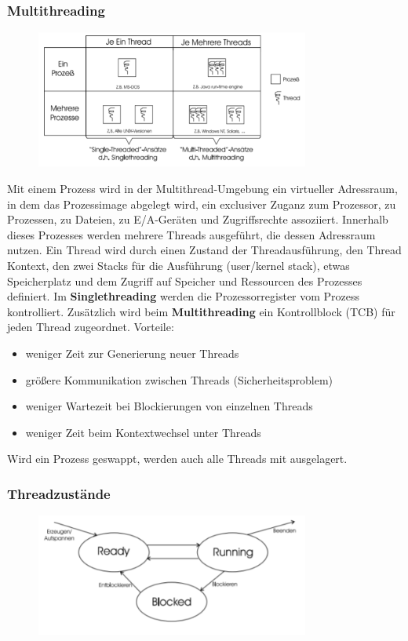 \documentclass{article}
\begin{document}
\subsubsection{Multithreading}
    \begin{figure}[h]
        \centering
	    \includegraphics[width=90mm]{Skizzen/2_Kapitel/multithread.png}
    \end{figure}
    Mit einem Prozess wird in der Multithread-Umgebung ein virtueller Adressraum, in dem das Prozessimage abgelegt wird, ein exclusiver Zuganz zum Prozessor, zu Prozessen, zu Dateien, zu E/A-Geräten und Zugriffsrechte assoziiert.\newline
    Innerhalb dieses Prozesses werden mehrere Threads ausgeführt, die dessen Adressraum nutzen. Ein Thread wird durch einen Zustand der Threadausführung, den Thread Kontext, den zwei Stacks für die Ausführung (user/kernel stack), etwas Speicherplatz und dem Zugriff auf Speicher und Ressourcen des Prozesses definiert.\newline
    Im \textbf{Singlethreading} werden die Prozessorregister vom Prozess kontrolliert. Zusätzlich wird beim \textbf{Multithreading} ein Kontrollblock (TCB) für jeden Thread zugeordnet.\newline
    Vorteile:
    \begin{itemize}
        \item weniger Zeit zur Generierung neuer Threads
        \item größere Kommunikation zwischen Threads (Sicherheitsproblem)
        \item weniger Wartezeit bei Blockierungen von einzelnen Threads
        \item weniger Zeit beim Kontextwechsel unter Threads
    \end{itemize}
    Wird ein Prozess geswappt, werden auch alle Threads mit ausgelagert. 
\subsubsection{Threadzustände}
    \begin{figure}[h]
        \centering
	    \includegraphics[width=90mm]{Skizzen/2_Kapitel/threadzustaende.png}
    \end{figure}
\end{document}
